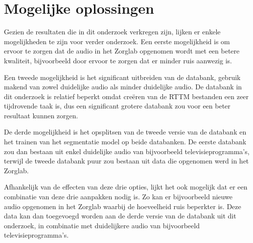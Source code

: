 \section{Mogelijke oplossingen}
\label{sec:opl}
Gezien de resultaten die in dit onderzoek verkregen zijn, lijken er enkele mogelijkheden te zijn voor verder onderzoek. Een eerste mogelijkheid is om ervoor te zorgen dat de audio in het Zorglab opgenomen wordt met een betere kwaliteit, bijvoorbeeld door ervoor te zorgen dat er minder ruis aanwezig is.

Een tweede mogelijkheid is het significant uitbreiden van de databank, gebruik makend van zowel duidelijke audio als minder duidelijke audio. De databank in dit onderzoek is relatief beperkt omdat creëren van de RTTM bestanden een zeer tijdrovende taak is, dus een significant grotere databank zou voor een beter resultaat kunnen zorgen.

De derde mogelijkheid is het opsplitsen van de tweede versie van de databank en het trainen van het segmentatie model op beide databanken. De eerste databank zou dan bestaan uit enkel duidelijke audio van bijvoorbeeld televisieprogramma's, terwijl de tweede databank puur zou bestaan uit data die opgenomen werd in het Zorglab.

Afhankelijk van de effecten van deze drie opties, lijkt het ook mogelijk dat er een combinatie van deze drie aanpakken nodig is. Zo kan er bijvoorbeeld nieuwe audio opgenomen in het Zorglab waarbij de hoeveelheid ruis beperkter is. Deze data kan dan toegevoegd worden aan de derde versie van de databank uit dit onderzoek, in combinatie met duidelijkere audio van bijvoorbeeld televisieprogramma's.



